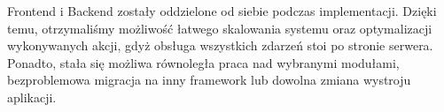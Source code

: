 Frontend i Backend zostały oddzielone od siebie podczas implementacji. Dzięki temu, otrzymaliśmy możliwość łatwego skalowania systemu oraz optymalizacji wykonywanych akcji, gdyż obsługa wszystkich zdarzeń stoi po stronie serwera. Ponadto, stała się możliwa równoległa praca nad wybranymi modułami, bezproblemowa migracja na inny framework lub dowolna zmiana wystroju aplikacji. 